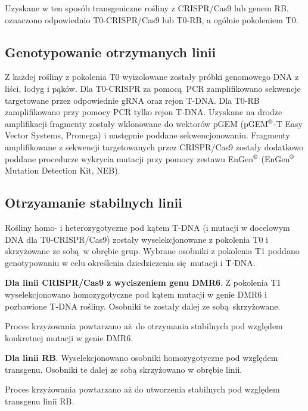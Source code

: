 \documentclass[two column, twoside, a4paper]{article}
\begin{document}
Uzyskane w ten sposób transgeniczne rośliny z CRISPR/Cas9 lub genem RB, oznaczono odpowiednio T0-CRISPR/Cas9 lub T0-RB, a ogólnie pokoleniem T0.

\subsection{Genotypowanie otrzymanych linii}

Z każdej rośliny z pokolenia T0 wyizolowane zostały próbki genomowego DNA z liści, łodyg i pąków. Dla T0-CRISPR za pomocą PCR zamplifikowano sekwencje targetowane przez odpowiednie gRNA oraz rejon T-DNA. Dla T0-RB zamplifikowano przy pomocy PCR tylko rejon T-DNA. Uzyskane na drodze amplifikacji fragmenty zostały wklonowane do wektorów pGEM (pGEM$^{\text{\textregistered}}$-T Easy Vector Systems, \textsf{Promega}) i następnie poddane sekwencjonowaniu. Fragmenty amplifikowane z sekwencji targetowanych przez CRISPR/Cas9 zostały dodatkowo poddane procedurze wykrycia mutacji przy pomocy zestawu EnGen$^{\text{\textregistered}}$ (EnGen$^{\text{\textregistered}}$ Mutation Detection Kit, \textsf{NEB}).

\subsection{Otrzyamanie stabilnych linii}

Rośliny homo- i heterozygotyczne pod kątem T-DNA (i mutacji w docelowym DNA dla T0-CRISPR/Cas9) zostały wyselekcjonowane z pokolenia T0 i skrzyżowane ze sobą w obrębie grup. Wybrane osobniki z pokolenia T1 poddano genotypowaniu w celu określenia dziedziczenia się mutacji i T-DNA.

\textbf{Dla linii CRISPR/Cas9 z wyciszeniem genu DMR6}. Z pokolenia T1 wyselekcjonowano homozygotyczne pod kątem mutacji w genie DMR6 i pozbawione T-DNA rośliny. Osobniki te zostały dalej ze sobą skrzyżowane.

Proces krzyżowania powtarzano aż do otrzymania stabilnych pod względem konkretnej mutacji w genie DMR6.

\textbf{Dla linii RB}. Wyselekcjonowano osobniki homozygotyczne pod względem transgenu. Osobniki te dalej ze sobą skrzyżowano w obrębie linii.

Proces krzyżowania powtarzano aż do utworzenia stabilnych pod względem transgenu linii RB.
\end{document}
